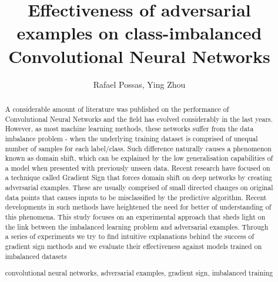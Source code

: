 \documentclass[runningheads,a4paper]{llncs}
\newcommand{\keywords}[1]{\par\addvspace\baselineskip
\noindent\keywordname\enspace\ignorespaces#1}
\begin{document}
\mainmatter  %

\title{Effectiveness of adversarial examples on class-imbalanced Convolutional Neural Networks}

%
%
\author{Rafael Possas, Ying Zhou}
%


%
%

\maketitle


\begin{abstract}
A considerable amount of literature was published on the performance of Convolutional Neural Networks and the field has evolved considerably in the last years. However, as most machine learning methods, these networks suffer from the data imbalance problem - when the underlying training dataset is comprised of unequal number of samples for each label/class. Such difference naturally causes a phenomenon known as domain shift, which can be explained by the low generalisation capabilities of a model when presented with previously unseen data. Recent research have focused on a technique called Gradient Sign that forces domain shift on deep networks by creating adversarial examples. These are usually comprised of small directed changes on original data points that causes inputs to be misclassified by the predictive algorithm. Recent developments in such methods have heightened the need for better of understanding of this phenomena. This study focuses on an experimental approach that sheds light on the link between the imbalanced learning problem and adversarial examples. Through a series of experiments we try to find intuitive explanations behind the success of gradient sign methods and we evaluate their effectiveness against models trained on imbalanced datasets
\keywords{convolutional neural networks, adversarial examples, gradient sign, imbalanced training}
\end{abstract}
\end{document}
